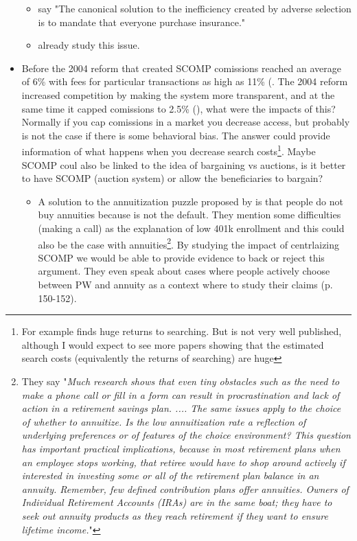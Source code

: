 \documentclass[12pt]{article}
\theoremstyle{plain}
\theoremstyle{plain}
\begin{document}
\begin{itemize}
    \begin{itemize}
        \item \textcite{einav_selection_2011} say "The canonical solution to the inefficiency created by adverse selection is to mandate that everyone purchase insurance."

        \item \textcite{illanes_retirement_2019} already study this issue. 
    \end{itemize}

    \item Before the 2004 reform that created SCOMP comissions reached an average of 6\% with fees for particular transactions as high as 11\% (\cite[p. 390]{morales_chilean_2017}. The 2004 reform increased competition by making the system more transparent, and at the same time it capped comissions to 2.5\% (\cite[p. 391]{morales_chilean_2017}), what were the impacts of this? Normally if you cap comissions in a market you decrease access, but probably is not the case if there is some behavioral bias. The answer could provide information of what happens when you decrease search costs\footnote{For example \textcite{cannon_price_2015} finds huge returns to searching. But is not very well published, although I would expect to see more papers showing that the estimated search costs (equivalently the returns of searching) are huge }.  Maybe SCOMP coul also be linked to the idea of bargaining vs auctions, is it better to have SCOMP (auction system) or allow the beneficiaries to bargain? 

    \begin{itemize}
        \item A solution to the annuitization puzzle proposed by \textcite{benartzi_annuitization_2011} is that people do not buy annuities because is not the default. They mention some difficulties (making a call) as the explanation of low 401k enrollment and this could also be the case with annuities\footnote{They say "\textit{Much research shows that even tiny obstacles such as the need to make a phone call or fill in a form can result in  procrastination and lack of action in a retirement savings plan. .... 
        The same issues apply to the choice of whether to annuitize. Is the low annuitization rate a reflection of underlying preferences or of features of the choice environment? This question has important practical implications, because in most retirement plans when an employee stops working, that retiree would have to shop  around actively if interested in investing some or all of the retirement plan balance in an annuity. Remember, few defined contribution plans offer annuities.  Owners of Individual Retirement Accounts (IRAs) are in the same boat; they have to seek out  annuity products as they reach retirement if they want to ensure lifetime income.}"}. By studying the impact of centrlaizing SCOMP we would be able to provide evidence to back or reject this argument. They even speak about cases where people actively choose between PW and annuity as a context where to study their claims (p. 150-152). 
    \end{itemize}


\end{itemize}
\end{document}
